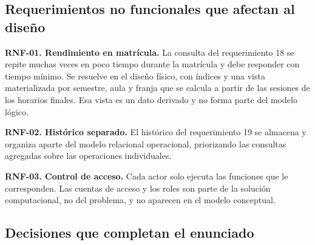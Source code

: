 \subsection{Requerimientos no funcionales que afectan al diseño}

\textbf{RNF-01. Rendimiento en matrícula.} La consulta del requerimiento 18 se repite muchas veces en poco tiempo durante la matrícula y debe responder con tiempo mínimo. Se resuelve en el diseño físico, con índices y una vista materializada por semestre, aula y franja que se calcula a partir de las sesiones de los horarios finales. Esa vista es un dato derivado y no forma parte del modelo lógico.

\textbf{RNF-02. Histórico separado.} El histórico del requerimiento 19 se almacena y organiza aparte del modelo relacional operacional, priorizando las consultas agregadas sobre las operaciones individuales.

\textbf{RNF-03. Control de acceso.} Cada actor solo ejecuta las funciones que le corresponden. Las cuentas de acceso y los roles son parte de la solución computacional, no del problema, y no aparecen en el modelo conceptual.

\subsection{Decisiones que completan el enunciado}


